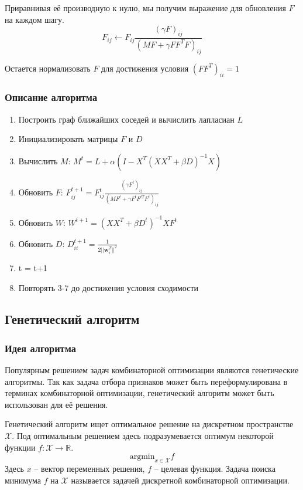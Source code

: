 Приравнивая её производную к нулю, мы получим выражение для обновления $F$ на каждом шагу.
\begin{equation}
	F_{ij} \leftarrow F_{ij} \frac{(\gamma F)_{ij}}{(MF + \gamma F F^T F)_{ij}}
\end{equation}

Остается нормализовать $F$ для достижения условия $(F F^T)_{ii} = 1 $

\subsubsection{Описание алгоритма}
\begin{enumerate}
	\item Построить граф ближайших соседей и вычислить лапласиан $L$
	\item Инициализировать матрицы $F$ и $D$
	\item Вычислить $M$: $M^t = L + \alpha(I - X^T(X X^T + \beta D)^{-1} X)$
	\item Обновить $F$: $F_{ij}^{t+1} = F_{ij}^t \frac{(\gamma F^t)_{ij}}{(MF^t + \gamma F^t F^{tT} F^t)_{ij}}$
	\item Обновить $W$: $ W^{t+1} = (XX^T + \beta D^t)^{-1} X F^t$
	\item Обновить $D$: $D_{ii}^{t+1} = \frac{1}{2 ||\mathbf{w}_i^T||^2}$
	\item t = t+1
	\item Повторять 3-7 до достижения условия сходимости
\end{enumerate}

\subsection{Генетический алгоритм}
\subsubsection{Идея алгоритма}
Популярным решением задач комбинаторной оптимизации являются генетические алгоритмы. Так как задача отбора признаков может быть переформулирована в терминах комбинаторной оптимизации, генетический алгоритм может быть использован для её решения\cite{yang2010nature}.

Генетический алгоритм ищет оптимальное решение на дискретном пространстве $\mathcal{X}$. Под оптимальным решением здесь подразумевается оптимум некоторой функции $f : \mathcal{X} \rightarrow \mathbb{R}$.
\begin{equation}
	\text{argmin}_{x \in \mathcal{X}} f
\end{equation}
Здесь $x$ -- вектор переменных решения, $f$ -- целевая функция. Задача поиска минимума $f$ на $\mathcal{X}$ называется задачей дискретной комбинаторной оптимизации. 

